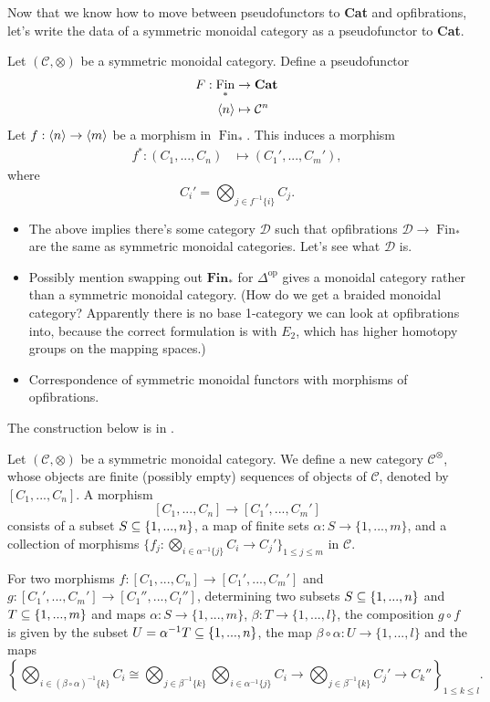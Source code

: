 \documentclass{MetricNotes2023}
\def\subq{\ensuremath\subseteq}
\DeclareMathOperator{\Fin}{Fin}
\begin{document}
Now that we know how to move between pseudofunctors to \textbf{Cat} and opfibrations, let's write the data of a symmetric monoidal category as a pseudofunctor to \textbf{Cat}.

Let \((\mathcal{C}, \otimes)\) be a symmetric monoidal category. Define a pseudofunctor 
\begin{align*}
F : \Fin_* &\to \textbf{Cat}\\
\ang{n}&\mapsto \mathcal{C}^n
\end{align*}
Let \(f : \langle n\rangle\to \langle m\rangle\) be a morphism in \(\Fin_*\). This induces a morphism 
\begin{align*}
f^* : (C_1, ...,C_n) &\mapsto (C_1', ..., C_m'),	
\end{align*}
where
\[C_i' = \bigotimes_{j \in f^{-1}\{i\}}C_j.\]

\begin{itemize}
\item The above implies there's some category \(\mathcal{D}\) such that opfibrations \(\mathcal{D}\to \Fin_*\) are the same as symmetric monoidal categories. Let's see what \(\mathcal{D}\) is.
\item Possibly mention swapping out \(\textbf{Fin}_*\) for \(\Delta^{\text{op}}\) gives a monoidal category rather than a symmetric monoidal category. (How do we get a braided monoidal category? Apparently there is no base 1-category we can look at opfibrations into, because the correct formulation is with \(E_2\), which has higher homotopy groups on the mapping spaces.)
\item Correspondence of symmetric monoidal functors with morphisms of opfibrations.
\end{itemize}

The construction below is in \autocite{higheralgebra}. 

Let \((\mathcal{C}, \otimes)\) be a symmetric monoidal category. We define a new category \(\mathcal{C}^\otimes\), whose objects are finite (possibly empty) sequences of objects of \(\mathcal{C}\), denoted by \([C_1, ..., C_n]\). A morphism 
\[[C_1, ..., C_n]\to [C_1', ..., C_m']\]
consists of a subset \(S \subq \{1, ..., n\}\), a map of finite sets \(\alpha : S \to \{1, ..., m\}\), and a collection of morphisms \(\{f_j : \bigotimes_{i \in \alpha^{-1}\{j\}} C_i \to C_j'\}_{1 \leq j \leq m}\) in \(\mathcal{C}\). 

For two morphisms \(f : [C_1, ..., C_n]\to [C_1', ..., C_m']\) and \(g : [C_1', ..., C_m']\to[C_1'', ..., C_l'']\), determining two subsets \(S \subq \{1, ..., n\}\) and \(T \subq \{1, ..., m\}\) and maps \(\alpha : S \to \{1, ..., m\}\), \(\beta : T \to \{1, ..., l\}\), the composition \(g \circ f\) is given by the subset \(U = \alpha^{-1}T \subq \{1, ..., n\}\), the map \(\beta \circ \alpha : U \to \{1, ..., l\}\) and the maps 
\[\left\{\bigotimes_{i \in (\beta \circ \alpha)^{-1}\{k\}} C_i \cong \bigotimes_{j \in \beta^{-1}\{k\}}\bigotimes_{i \in \alpha^{-1}\{j\}}C_i \to \bigotimes_{j \in \beta^{-1}\{k\}}C_j' \to C_k''\right\}_{1 \leq k \leq l}.\] 
\end{document}
